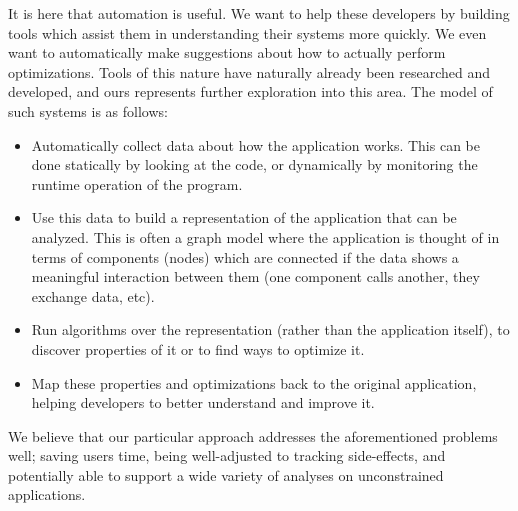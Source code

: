 \documentclass[msc,oneside]{ubcthesis}
\begin{document}
It is here that automation is useful. We want to help these developers by building tools which assist them in understanding their systems more quickly. We even want to automatically make suggestions about how to actually perform optimizations. Tools of this nature have naturally already been researched and developed, and ours represents further exploration into this area. The model of such systems is as follows:\\

\begin{itemize}
\item Automatically collect data about how the application works. This can be done statically by looking at the code, or dynamically by monitoring the runtime operation of the program.
\item Use this data to build a representation of the application that can be analyzed. This is often a graph model where the application is thought of in terms of components (nodes) which are connected if the data shows a meaningful interaction between them (one component calls another, they exchange data, etc).
\item Run algorithms over the representation (rather than the application itself), to discover properties of it or to find ways to optimize it.
\item Map these properties and optimizations back to the original application, helping developers to better understand and improve it.
\end{itemize}

We believe that our particular approach addresses the aforementioned problems well; saving users time, being well-adjusted to tracking side-effects, and potentially able to support a wide variety of analyses on unconstrained applications.

%
%
	
%
\end{document}
